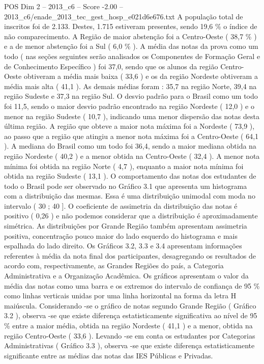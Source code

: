\begin{textsample}{POS Dim 2 – 2013\_c6 – Score -2.00 – 2013\_c6/enade\_2013\_tec\_gest\_hosp\_e021d6e676.txt}
A população total de inscritos foi de 2.133.
Destes, 1.715 estiveram presentes, sendo 19,6 \% o índice de não comparecimento.
A Região de maior abstenção foi a Centro-Oeste ( 38,7 \% ) e a de menor abstenção foi a Sul ( 6,0 \% ).
A média das notas da prova como um todo ( nas seções seguintes serão analisados os Componentes de Formação Geral e de Conhecimento Específico ) foi 37,0, sendo que os alunos da região Centro-Oeste obtiveram a média mais baixa ( 33,6 ) e os da região Nordeste obtiveram a média mais alta ( 41,1 ).
As demais médias foram : 35,7 na região Norte, 39,4 na região Sudeste e 37,3 na região Sul.
O desvio padrão para o Brasil como um todo foi 11,5, sendo o maior desvio padrão encontrado na região Nordeste ( 12,0 ) e o menor na região Sudeste ( 10,7 ), indicando uma menor dispersão das notas desta última região.
A região que obteve a maior nota máxima foi a Nordeste ( 73,9 ), ao passo que a região que atingiu a menor nota máxima foi a Centro-Oeste ( 64,1 ).
A mediana do Brasil como um todo foi 36,4, sendo a maior mediana obtida na região Nordeste ( 40,2 ) e a menor obtida na Centro-Oeste ( 32,4 ).
A menor nota mínima foi obtida na região Norte ( 4,7 ), enquanto a maior nota mínima foi obtida na região Sudeste ( 13,1 ).
O comportamento das notas dos estudantes de todo o Brasil pode ser observado no Gráfico 3.1 que apresenta um histograma com a distribuição das mesmas.
Essa é uma distribuição unimodal com moda no intervalo ( 30 ; 40 ].
O coeficiente de assimetria da distribuição das notas é positivo ( 0,26 ) e não podemos considerar que a distribuição é aproximadamente simétrica.
As distribuições por Grande Região também apresentam assimetria positiva, concentração pouco maior do lado esquerdo do histograma e mais espalhada do lado direito.
Os Gráficos 3.2, 3.3 e 3.4 apresentam informações referentes à média da nota final dos participantes, desagregando os resultados de acordo com, respectivamente, as Grandes Regiões do país, a Categoria Administrativa e a Organização Acadêmica.
Os gráficos apresentam o valor da média das notas como uma barra e os extremos do intervalo de confiança de 95 \% como linhas verticais unidas por uma linha horizontal na forma da letra H maiúscula.
Considerando -se o gráfico de notas segundo Grande Região ( Gráfico 3.2 ), observa -se que existe diferença estatisticamente significativa ao nível de 95 \% entre a maior média, obtida na região Nordeste ( 41,1 ) e a menor, obtida na região Centro-Oeste ( 33,6 ).
Levando -se em conta os estudantes por Categorias Administrativas ( Gráfico 3.3 ), observa -se que existe diferença estatisticamente significante entre as médias das notas das IES Públicas e Privadas.

\end{textsample}
